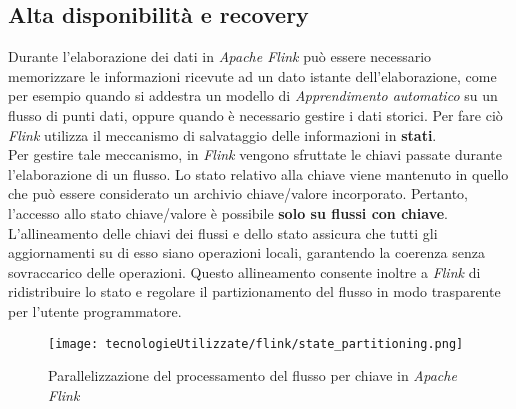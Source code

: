 \subsection{Alta disponibilità e recovery}
Durante l'elaborazione dei dati in \textit{Apache Flink} può essere necessario memorizzare le informazioni ricevute ad un dato istante dell'elaborazione, come per esempio quando si addestra un modello di \textit{\gls{Apprendimento automatico}} su un flusso di punti dati, oppure quando è necessario gestire i dati storici. Per fare ciò \textit{Flink} utilizza il meccanismo di salvataggio delle informazioni in \textbf{stati}.\\
Per gestire tale meccanismo, in \textit{Flink} vengono sfruttate le chiavi passate durante l'elaborazione di un flusso. Lo stato relativo alla chiave viene mantenuto in quello che può essere considerato un archivio chiave/valore incorporato. Pertanto, l'accesso allo stato chiave/valore è possibile \textbf{solo su flussi con chiave}. L'allineamento delle chiavi dei flussi e dello stato assicura che tutti gli aggiornamenti su di esso siano operazioni locali, garantendo la coerenza senza sovraccarico delle operazioni. Questo allineamento consente inoltre a \textit{Flink} di ridistribuire lo stato e regolare il partizionamento del flusso in modo trasparente per l'utente programmatore.

\begin{figure}[H] 
    \centering 
    \texttt{[image: tecnologieUtilizzate/flink/state\_partitioning.png]} 
    \caption{Parallelizzazione del processamento del flusso per chiave in \textit{Apache Flink}}
\end{figure}

